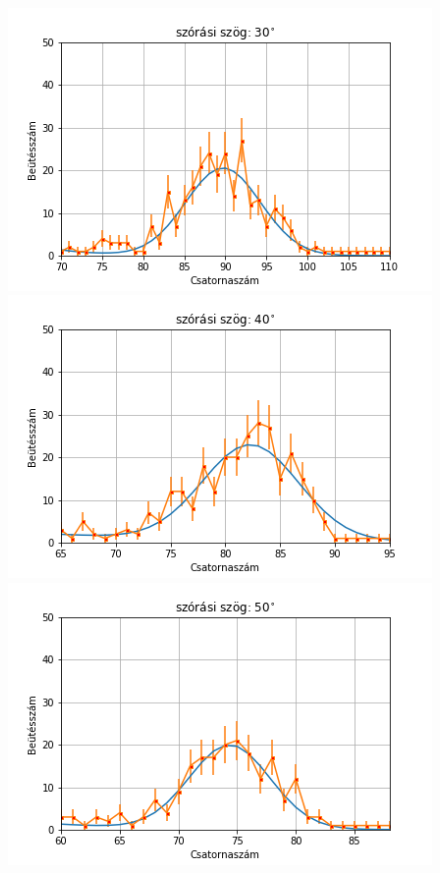 \documentclass[a4paper,12pt]{article}
\begin{document}
\begin{figure}[!htb]
    \centering
    \begin{minipage}{.49\textwidth}
        \centering
        \includegraphics[width=1.\linewidth]{../plots/withbackground/30_1224fit.png}
    \end{minipage}
    \begin{minipage}{.49\textwidth}
        \centering
        \includegraphics[width=1.\linewidth]{../plots/withbackground/40_1085fit.png}
    \end{minipage}
    \begin{minipage}{.49\textwidth}
        \centering
        \includegraphics[width=1.\linewidth]{../plots/withbackground/50_1002fit.png}

\end{minipage}
\end{figure}
\end{document}
